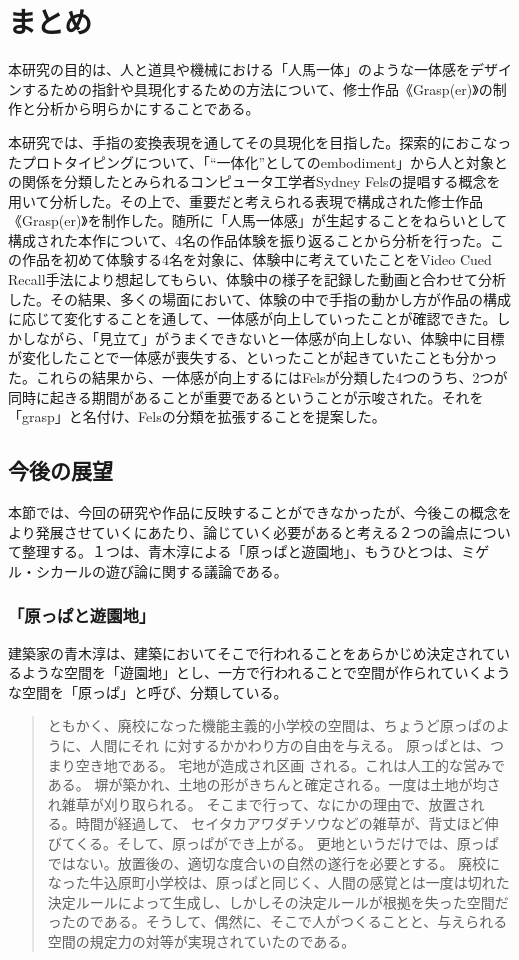 \chapter{まとめ}
\label{matome}
本研究の目的は、人と道具や機械における「人馬一体」のような一体感をデザインするための指針や具現化するための方法について、修士作品《Grasp(er)》の制作と分析から明らかにすることである。

本研究では、手指の変換表現を通してその具現化を目指した。探索的におこなったプロトタイピングについて、「``一体化''としてのembodiment」から人と対象との関係を分類したとみられるコンピュータ工学者Sydney Felsの提唱する概念を用いて分析した。その上で、重要だと考えられる表現で構成された修士作品《Grasp(er)》を制作した。随所に「人馬一体感」が生起することをねらいとして構成された本作について、4名の作品体験を振り返ることから分析を行った。この作品を初めて体験する4名を対象に、体験中に考えていたことをVideo Cued Recall手法により想起してもらい、体験中の様子を記録した動画と合わせて分析した。その結果、多くの場面において、体験の中で手指の動かし方が作品の構成に応じて変化することを通して、一体感が向上していったことが確認できた。しかしながら、「見立て」がうまくできないと一体感が向上しない、体験中に目標が変化したことで一体感が喪失する、といったことが起きていたことも分かった。これらの結果から、一体感が向上するにはFelsが分類した4つのうち、2つが同時に起きる期間があることが重要であるということが示唆された。それを「grasp」と名付け、Felsの分類を拡張することを提案した。

\section{今後の展望}

本節では、今回の研究や作品に反映することができなかったが、今後この概念をより発展させていくにあたり、論じていく必要があると考える２つの論点について整理する。１つは、青木淳による「原っぱと遊園地」、もうひとつは、ミゲル・シカールの遊び論に関する議論である。

\subsection{「原っぱと遊園地」}
建築家の青木淳は、建築においてそこで行われることをあらかじめ決定されているような空間を「遊園地」とし、一方で行われることで空間が作られていくような空間を「原っぱ」と呼び、分類している。

\begin{quote}
  ともかく、廃校になった機能主義的小学校の空間は、ちょうど原っぱのように、人間にそれ に対するかかわり方の自由を与える。 原っぱとは、つまり空き地である。 宅地が造成され区画 される。これは人工的な営みである。 塀が築かれ、土地の形がきちんと確定される。一度は土地が均され雑草が刈り取られる。 そこまで行って、なにかの理由で、放置される。時間が経過して、 セイタカアワダチソウなどの雑草が、背丈ほど伸びてくる。そして、原っぱができ上がる。 更地というだけでは、原っぱではない。放置後の、適切な度合いの自然の遂行を必要とする。 
  廃校になった牛込原町小学校は、原っぱと同じく、人間の感覚とは一度は切れた決定ルールによって生成し、しかしその決定ルールが根拠を失った空間だったのである。そうして、偶然に、そこで人がつくることと、与えられる空間の規定力の対等が実現されていたのである。  
\end{quote}

